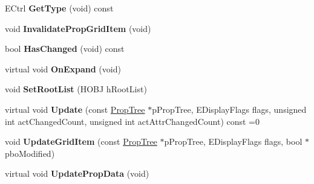 \begin{DoxyCompactItemize}
\item 
\hypertarget{class_prop_data_a88583895f4bdbc1a8c4e9f983b7fd80b}{E\+Ctrl {\bfseries Get\+Type} (void) const }\label{class_prop_data_a88583895f4bdbc1a8c4e9f983b7fd80b}

\item 
\hypertarget{class_prop_data_a2516c9a7ef53160799555c0fbc04a403}{void {\bfseries Invalidate\+Prop\+Grid\+Item} (void)}\label{class_prop_data_a2516c9a7ef53160799555c0fbc04a403}

\item 
\hypertarget{class_prop_data_ac7411f9f2de50906d19e2af709011953}{bool {\bfseries Has\+Changed} (void) const }\label{class_prop_data_ac7411f9f2de50906d19e2af709011953}

\item 
\hypertarget{class_prop_data_a8af2c1be4bbbe1f7ead58e3dd42d58e3}{virtual void {\bfseries On\+Expand} (void)}\label{class_prop_data_a8af2c1be4bbbe1f7ead58e3dd42d58e3}

\item 
\hypertarget{class_prop_data_a307288cdbfa6a93e0cf2ea7042563082}{void {\bfseries Set\+Root\+List} (H\+O\+B\+J h\+Root\+List)}\label{class_prop_data_a307288cdbfa6a93e0cf2ea7042563082}

\item 
\hypertarget{class_prop_data_ad27e230401f2ea67e6c86956dd90dc81}{virtual void {\bfseries Update} (const \hyperlink{class_prop_tree}{Prop\+Tree} $\ast$p\+Prop\+Tree, E\+Display\+Flags flags, unsigned int act\+Changed\+Count, unsigned int act\+Attr\+Changed\+Count) const =0}\label{class_prop_data_ad27e230401f2ea67e6c86956dd90dc81}

\item 
\hypertarget{class_prop_data_aafde42ec0843080b1a2c4716fb12ffde}{void {\bfseries Update\+Grid\+Item} (const \hyperlink{class_prop_tree}{Prop\+Tree} $\ast$p\+Prop\+Tree, E\+Display\+Flags flags, bool $\ast$pbo\+Modified)}\label{class_prop_data_aafde42ec0843080b1a2c4716fb12ffde}

\item 
\hypertarget{class_prop_data_a0c2f298073aafa50076872d398ae0ea6}{virtual void {\bfseries Update\+Prop\+Data} (void)}\label{class_prop_data_a0c2f298073aafa50076872d398ae0ea6}

\end{DoxyCompactItemize}
